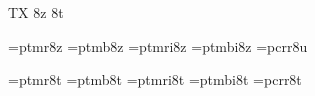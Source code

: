 
\ifx\ffdecl\undefined  \fi

\ffdecl [Times] {\caps{\rm\bf}} {\rm \bf \it \bi} {} {TX} {8z 8t}

\def\caps{\ffvars{r}{b}{!}{!}\ffsetV{caps}{c}\ffsetX} 
\def\nocaps{\ffsetX} 
\nocaps\relax %
\def\ffwarning#1{\ffmessage{FONT warning: Times - \string\caps#1 unavailable}}

\ismacro{}\ifttrue
   \font\tenrm=ptmr8z   \sizespec
   \font\tenbf=ptmb8z   \sizespec
   \font\tenit=ptmri8z  \sizespec
   \font\tenbi=ptmbi8z  \sizespec
   \font\tentt=pcrr8u   \sizespec
   \let\tensl=\tenit

   \def\ffnamegen{ptm\ffvarV\capsV 8z}

   
\fi

\ismacro{}\ifttrue
   \font\tenrm=ptmr8t   \sizespec
   \font\tenbf=ptmb8t   \sizespec
   \font\tenit=ptmri8t  \sizespec
   \font\tenbi=ptmbi8t  \sizespec
   \font\tentt=pcrr8t   \sizespec
   \let\tensl=\tenit

   \def\ffnamegen{ptm\ffvarV\capsV 8t}
\fi

\tenrm

\let\setsimplemath=\relax %

\def\tmTeX{T\kern-.1667em\lower.3333ex\hbox{E}\kern-.125emX}
\ifx\origTeX\undefined \let\origTeX=\TeX \fi
\let\TeX=\tmTeX

\ifx\loadmathfonts\relax \endinput \fi
\ifx\mathpreloaded X\else  \fi                     


